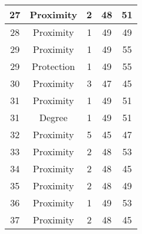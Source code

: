 \documentclass[results.tex]{subfiles}
\begin{document}
\begin{center}
\begin{tabular}{| c || c | c | c | c |}
            \hline
            27                      & Proximity                    & 2                      & 48                      & 51                   \\
            \hline
            28                      & Proximity                    & 1                      & 49                      & 49                   \\
            \hline
            29                      & Proximity                    & 1                      & 49                      & 55                   \\
            \hline
            29                      & Protection                   & 1                      & 49                      & 55                   \\
            \hline
            30                      & Proximity                    & 3                      & 47                      & 45                   \\
            \hline
            31                      & Proximity                    & 1                      & 49                      & 51                   \\
            \hline
            31                      & Degree                       & 1                      & 49                      & 51                   \\
            \hline
            32                      & Proximity                    & 5                      & 45                      & 47                   \\
            \hline
            33                      & Proximity                    & 2                      & 48                      & 53                   \\
            \hline
            34                      & Proximity                    & 2                      & 48                      & 45                   \\
            \hline
            35                      & Proximity                    & 2                      & 48                      & 49                   \\
            \hline
            36                      & Proximity                    & 1                      & 49                      & 53                   \\
            \hline
            37                      & Proximity                    & 2                      & 48                      & 45                   \\

\end{tabular}
\end{center}
\end{document}
